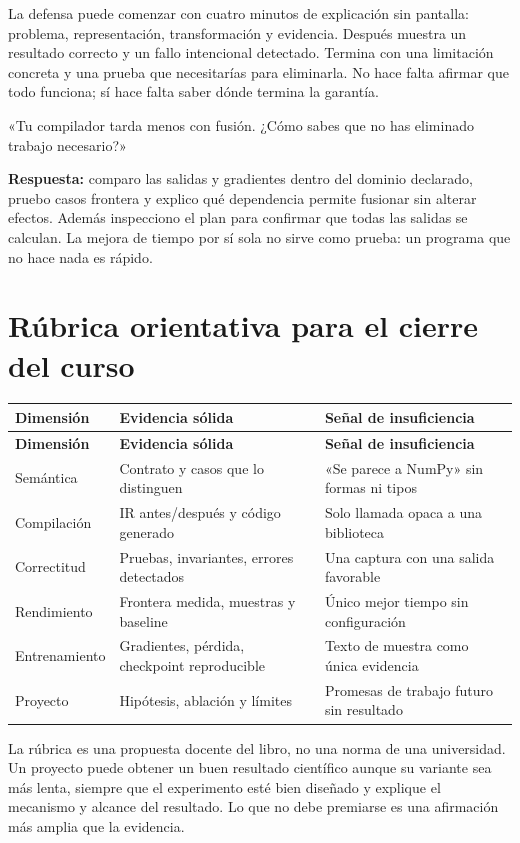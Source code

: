 \documentclass[12pt,a4paper,oneside]{report}
\begin{document}
La defensa puede comenzar con cuatro minutos de explicación sin pantalla: problema, representación, transformación y evidencia. Después muestra un resultado correcto y un fallo intencional detectado. Termina con una limitación concreta y una prueba que necesitarías para eliminarla. No hace falta afirmar que todo funciona; sí hace falta saber dónde termina la garantía.

\begin{practica}
«Tu compilador tarda menos con fusión. ¿Cómo sabes que no has eliminado trabajo necesario?»

\textbf{Respuesta:} comparo las salidas y gradientes dentro del dominio declarado, pruebo casos frontera y explico qué dependencia permite fusionar sin alterar efectos. Además inspecciono el plan para confirmar que todas las salidas se calculan. La mejora de tiempo por sí sola no sirve como prueba: un programa que no hace nada es rápido.

\end{practica}
\section{Rúbrica orientativa para el cierre del curso}
{\small
\begin{longtable}{@{}P{0.28\textwidth}P{0.32\textwidth}P{0.34\textwidth}@{}}
\toprule
\textbf{Dimensión} & \textbf{Evidencia sólida} & \textbf{Señal de insuficiencia}\\
\midrule
\endfirsthead
\toprule
\textbf{Dimensión} & \textbf{Evidencia sólida} & \textbf{Señal de insuficiencia}\\
\midrule
\endhead
Semántica & Contrato y casos que lo distinguen & «Se parece a NumPy» sin formas ni tipos\\
Compilación & IR antes/después y código generado & Solo llamada opaca a una biblioteca\\
Correctitud & Pruebas, invariantes, errores detectados & Una captura con una salida favorable\\
Rendimiento & Frontera medida, muestras y baseline & Único mejor tiempo sin configuración\\
Entrenamiento & Gradientes, pérdida, checkpoint reproducible & Texto de muestra como única evidencia\\
Proyecto & Hipótesis, ablación y límites & Promesas de trabajo futuro sin resultado\\
\bottomrule
\end{longtable}
}
La rúbrica es una propuesta docente del libro, no una norma de una universidad. Un proyecto puede obtener un buen resultado científico aunque su variante sea más lenta, siempre que el experimento esté bien diseñado y explique el mecanismo y alcance del resultado. Lo que no debe premiarse es una afirmación más amplia que la evidencia.
\end{document}
